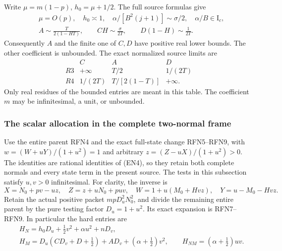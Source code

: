 Write $\mu=m(1-p)$, $h_0=\mu+1/2$. The full source formulas give
\[
\begin{aligned}
&\mu=O(p),\quad h_0\asymp1,\quad
\alpha/[B^2(j+1)]\sim\sigma/2,\quad \alpha/B\in\mathrm I_c,\\
&A\sim\frac{T}{2(1-HT)},\qquad
CH\sim\frac{\sigma}{2T},\qquad
D(1-H)\sim\frac1{2T}.
\end{aligned}                                                    \tag{EN8}
\]
Consequently $A$ and the finite one of $C,D$ have positive real
lower bounds. The other coefficient is unbounded. The exact
normalized source limits are
\[
\begin{array}{c|c|c|c}
 & C&A&D\\ \hline
R3&+\infty&T/2&1/(2T)\\
R4&1/(2T)&T/[2(1-T)]&+\infty .
\end{array}                                                    \tag{EN9}
\]
Only real residues of the bounded entries are meant in this table.
The coefficient $m$ may be infinitesimal, a unit, or unbounded.

\subsubsection*{The scalar allocation in the complete two-normal frame}

Use the entire parent RFN4 and the exact full-state change RFN5--RFN9,
with $w=(W+uY)/(1+u^2)=1$ and arbitrary $z=(Z-uX)/(1+u^2)>0$.
The identities are rational identities of (EN4), so they retain
both complete normals and every state term in the present source.
The tests in this subsection satisfy $u,v>0$ infinitesimal.
For clarity, the inverse is
\[
X=N_0+pv-uz,\quad Z=z+uN_0+puv,\quad
W=1+u(M_0+Hvz),\quad Y=u-M_0-Hvz.                       \tag{EN10}
\]
Retain the actual positive packet $mpD_u^2N_0^2$, and divide the
remaining entire parent by the pure testing factor $D_u=1+u^2$.
Its exact expansion is RFN7--RFN9. In particular the hard entries are
\[
\begin{aligned}
&H_N=h_0D_u+\tfrac12v^2+\alpha u^2+nD_v,\\
&H_M=D_u(CD_v+D+\tfrac12)+AD_v+(\alpha+\tfrac12)v^2,\qquad
H_{NM}=(\alpha+\tfrac12)uv .
\end{aligned}                                                    \tag{EN11}
\]

